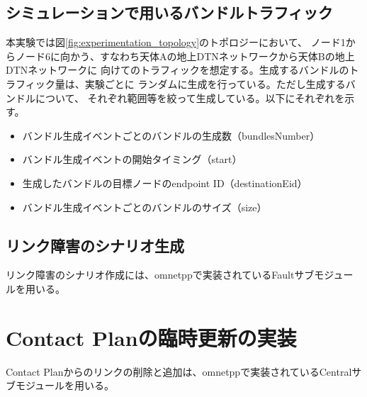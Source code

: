 \subsection{シミュレーションで用いるバンドルトラフィック}
\label{subsection:シミュレーションで用いるバンドルトラフィック}
本実験では図\ref{fig:experimentation_topology}のトポロジーにおいて、
ノード1からノード6に向かう、すなわち天体Aの地上DTNネットワークから天体Bの地上DTNネットワークに
向けてのトラフィックを想定する。生成するバンドルのトラフィック量は、実験ごとに
ランダムに生成を行っている。ただし生成するバンドルについて、
それぞれ範囲等を絞って生成している。以下にそれぞれを示す。
\begin{itemize}
    \item バンドル生成イベントごとのバンドルの生成数（bundlesNumber）
    \item バンドル生成イベントの開始タイミング（start）
    \item 生成したバンドルの目標ノードのendpoint ID（destinationEid）
    \item バンドル生成イベントごとのバンドルのサイズ（size）
\end{itemize}
\subsection{リンク障害のシナリオ生成}
リンク障害のシナリオ作成には、omnetppで実装されているFaultサブモジュールを用いる。
\section{Contact Planの臨時更新の実装}
Contact Planからのリンクの削除と追加は、omnetppで実装されているCentralサブモジュールを用いる。
